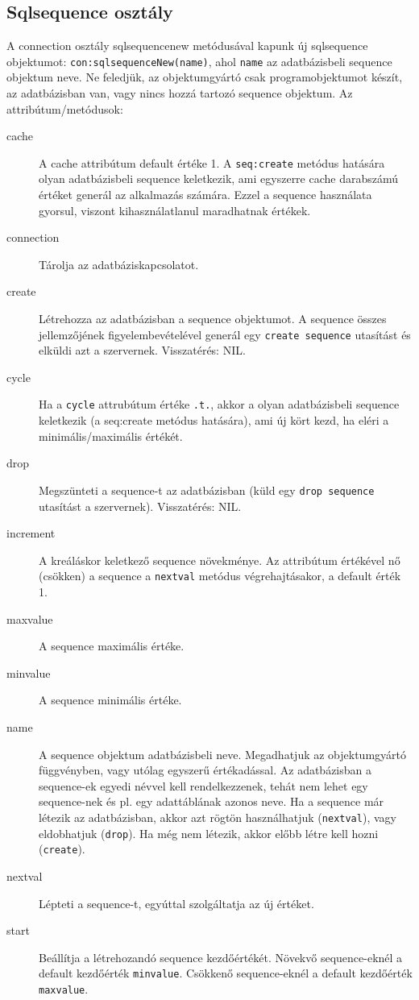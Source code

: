 \subsection{Sqlsequence osztály}

A connection osztály sqlsequencenew metódusával kapunk új
sqlsequence objektumot: \verb!con:sqlsequenceNew(name)!,
ahol \verb!name! az adatbázisbeli sequence objektum neve. 
Ne feledjük, az objektumgyártó csak programobjektumot készít, 
az adatbázisban van, vagy nincs hozzá tartozó sequence objektum.
Az attribútum/metódusok:

\begin{description}
\item[cache]
    A cache attribútum default értéke 1.
    A \verb!seq:create! metódus hatására olyan adatbázisbeli 
    sequence keletkezik, ami egyszerre cache darabszámú
    értéket generál az alkalmazás számára. Ezzel a sequence
    használata gyorsul, viszont kihasználatlanul maradhatnak
    értékek.
\item[connection]
    Tárolja az adatbáziskapcsolatot.
\item[create]
    Létrehozza az adatbázisban a sequence objektumot.
    A sequence összes jellemzőjének figyelembevételével
    generál egy \verb!create sequence! utasítást és elküldi azt a
    szervernek. Visszatérés: NIL.
\item[cycle]
    Ha a \verb!cycle! attrubútum értéke \verb!.t.!, 
    akkor a olyan adatbázisbeli sequence keletkezik 
    (a seq:create metódus hatására),
    ami új kört kezd, ha eléri a minimális/maximális értékét.
\item[drop]
    Megszünteti a sequence-t az adatbázisban (küld egy
    \verb!drop sequence! utasítást a szervernek).
    Visszatérés: NIL.
\item[increment]
    A kreáláskor keletkező sequence növekménye.
    Az attribútum értékével nő (csökken) a sequence 
    a \verb!nextval! metódus végrehajtásakor, a default érték 1.
\item[maxvalue]
    A sequence maximális értéke.
\item[minvalue]
    A sequence minimális értéke.
\item[name]
    A sequence objektum adatbázisbeli neve. Megadhatjuk 
    az objektumgyártó függvényben, vagy utólag egyszerű értékadással.
    Az adatbázisban a sequence-ek egyedi névvel kell rendelkezzenek,
    tehát nem lehet egy sequence-nek és pl. egy adattáblának azonos neve.
    Ha a sequence már létezik az adatbázisban, akkor azt rögtön
    használhatjuk (\verb!nextval!), vagy eldobhatjuk (\verb!drop!). 
    Ha még nem létezik, akkor előbb létre kell hozni (\verb!create!).
\item[nextval]
    Lépteti a sequence-t, egyúttal szolgáltatja az új értéket.
\item[start]
    Beállítja a létrehozandó sequence kezdőértékét. 
    Növekvő  sequence-eknél a default kezdőérték \verb!minvalue!.
    Csökkenő sequence-eknél a default kezdőérték \verb!maxvalue!.
\end{description}




